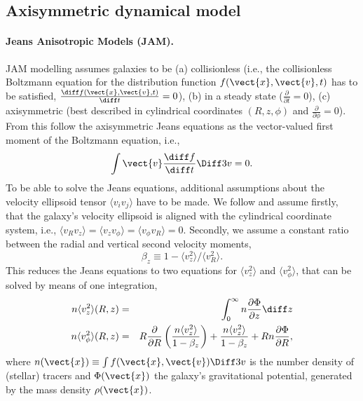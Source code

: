 \subsection{Axisymmetric dynamical model} \label{sec:model_JAM}

\paragraph{Jeans Anisotropic Models (JAM).} JAM modelling assumes galaxies to be (a) collisionless (i.e., the collisionless Boltzmann equation for the distribution function $f(\vect{x},\vect{v},t)$ has to be satisfied, $\frac{\diff f(\vect{x},\vect{v},t)}{\diff t} = 0$), (b) in a steady state ($\frac{\partial}{\partial t} = 0$), (c) axisymmetric (best described in cylindrical coordinates $(R,z,\phi)$ and $\frac{\partial}{\partial \phi} = 0$). From this follow the axisymmetric Jeans equations as the vector-valued first moment of the Boltzmann equation, i.e.,
\begin{equation*}
\int \vect{v} \frac{\diff f}{\diff t} \Diff3 v = 0.
\end{equation*}
To be able to solve the Jeans equations, additional assumptions about the velocity ellipsoid tensor $\langle v_i v_j\rangle$ have to be made. We follow \citet{Cap08} and assume firstly, that the galaxy's velocity ellipsoid is aligned with the cylindrical coordinate system, i.e., $\langle v_R v_z\rangle = \langle v_z v_\phi \rangle = \langle v_\phi v_R \rangle = 0$. Secondly, we assume a constant ratio between the radial and vertical second velocity moments, 
\begin{equation}
\beta_z \equiv 1 - \langle v_z^2 \rangle / \langle v_R^2\rangle. \label{eq:bz}
\end{equation}
This reduces the Jeans equations to two equations for $\langle v_z^2 \rangle$ and $\langle v_\phi^2 \rangle$, that can be solved by means of one integration,
\begin{eqnarray}
n \langle v_z^2 \rangle (R,z) &=& \int_0^\infty n \frac{\partial \Phi}{\partial z} \diff z \label{eq:Jeans1}\\
n \langle v_\phi^2 \rangle (R,z) &=& R \frac{\partial}{\partial R} \left( \frac{n \langle v_z^2 \rangle}{1-\beta_z} \right) + \frac{n \langle v_z^2 \rangle}{1 - \beta_z} + R n \frac{\partial \Phi}{\partial R},\label{eq:Jeans2}
\end{eqnarray}
where $n(\vect{x}) \equiv \int f(\vect{x},\vect{v}) \Diff3 v$ is the number density of (stellar) tracers and $\Phi(\vect{x})$ the galaxy's gravitational potential, generated by the mass density $\rho(\vect{x})$.

